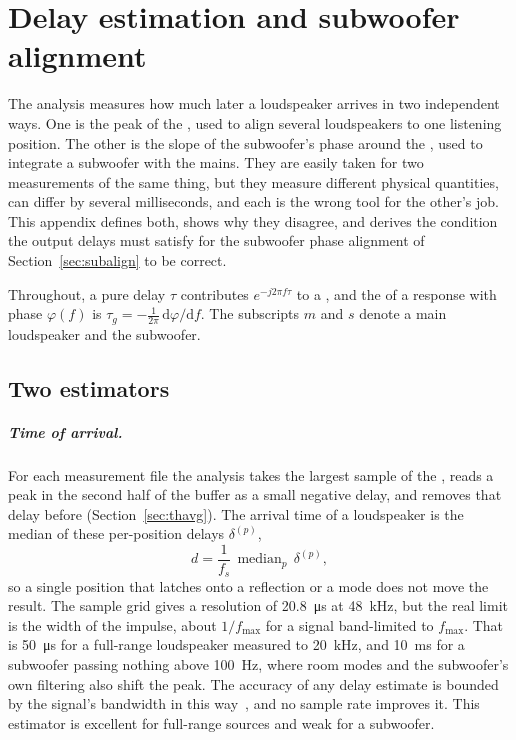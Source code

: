\chapter{Delay estimation and subwoofer alignment}\label{ch:delays}

The analysis measures how much later a loudspeaker arrives in two independent ways. One is the peak of the , used to align several loudspeakers to one listening position. The other is the slope of the subwoofer's phase around the , used to integrate a subwoofer with the mains. They are easily taken for two measurements of the same thing, but they measure different physical quantities, can differ by several milliseconds, and each is the wrong tool for the other's job. This appendix defines both, shows why they disagree, and derives the condition the output delays must satisfy for the subwoofer phase alignment of Section~\ref{sec:subalign} to be correct.

Throughout, a pure delay $\tau$ contributes $e^{-j2\pi f\tau}$ to a , and the  of a response with phase $\varphi(f)$ is $\tau_g = -\frac{1}{2\pi}\,\mathrm{d}\varphi/\mathrm{d}f$. The subscripts $m$ and $s$ denote a main loudspeaker and the subwoofer.

\section{Two estimators}
\paragraph{Time of arrival.} For each measurement file the analysis takes the largest sample of the , reads a peak in the second half of the buffer as a small negative delay, and removes that delay before  (Section~\ref{sec:thavg}). The arrival time of a loudspeaker is the median of these per-position delays $\delta^{(p)}$,
\begin{equation}
  d = \frac{1}{f_s}\,\operatorname{median}_p\,\delta^{(p)},
  \label{eq:dlyarrival}
\end{equation}
so a single position that latches onto a reflection or a mode does not move the result. The sample grid gives a resolution of \SI{20.8}{\micro\second} at \SI{48}{\kilo\hertz}, but the real limit is the width of the impulse, about $1/f_{\max}$ for a signal band-limited to $f_{\max}$. That is \SI{50}{\micro\second} for a full-range loudspeaker measured to \SI{20}{\kilo\hertz}, and \SI{10}{\milli\second} for a subwoofer passing nothing above \SI{100}{\hertz}, where room modes and the subwoofer's own filtering also shift the peak. The accuracy of any delay estimate is bounded by the signal's bandwidth in this way~\cite{Knapp1976}, and no sample rate improves it. This estimator is excellent for full-range sources and weak for a subwoofer.

